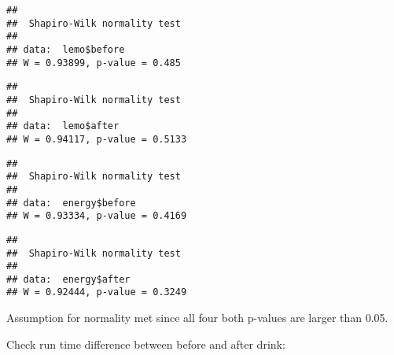 \documentclass[
]{article}
\newenvironment{Shaded}{\begin{snugshade}}{\end{snugshade}}
\newcommand{\AttributeTok}[1]{\textcolor[rgb]{0.77,0.63,0.00}{#1}}
\newcommand{\CommentTok}[1]{\textcolor[rgb]{0.56,0.35,0.01}{\textit{#1}}}
\newcommand{\ConstantTok}[1]{\textcolor[rgb]{0.00,0.00,0.00}{#1}}
\newcommand{\FunctionTok}[1]{\textcolor[rgb]{0.00,0.00,0.00}{#1}}
\newcommand{\NormalTok}[1]{#1}
\newcommand{\SpecialCharTok}[1]{\textcolor[rgb]{0.00,0.00,0.00}{#1}}
\begin{document}
\begin{verbatim}
## 
##  Shapiro-Wilk normality test
## 
## data:  lemo$before
## W = 0.93899, p-value = 0.485
\end{verbatim}

\begin{Shaded}
\end{Shaded}

\begin{verbatim}
## 
##  Shapiro-Wilk normality test
## 
## data:  lemo$after
## W = 0.94117, p-value = 0.5133
\end{verbatim}

\begin{Shaded}
\end{Shaded}

\begin{verbatim}
## 
##  Shapiro-Wilk normality test
## 
## data:  energy$before
## W = 0.93334, p-value = 0.4169
\end{verbatim}

\begin{Shaded}
\end{Shaded}

\begin{verbatim}
## 
##  Shapiro-Wilk normality test
## 
## data:  energy$after
## W = 0.92444, p-value = 0.3249
\end{verbatim}

Assumption for normality met since all four both p-values are larger
than 0.05.

Check run time difference between before and after drink:

\begin{Shaded}
\end{Shaded}
\end{document}
